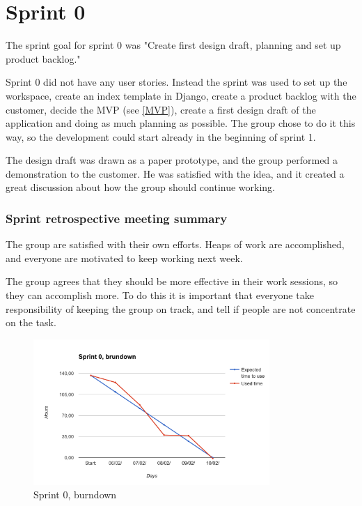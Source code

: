 \section{Sprint 0}
\label{sprint0}
The sprint goal for sprint 0 was "Create first design draft, planning and set up product backlog."

Sprint 0 did not have any user stories. Instead the sprint was used to set up the workspace, create an index template in Django, create a product backlog with the customer, decide the MVP (see \ref{MVP}), create a first design draft of the application and doing as much planning as possible. The group chose to do it this way, so the development could start already in the beginning of sprint 1.

The design draft was drawn as a paper prototype, and the group performed a demonstration to the customer. He was satisfied with the idea, and it created a great discussion about how the group should continue working.

\subsubsection{Sprint retrospective meeting summary}
The group are satisfied with their own efforts. Heaps of work are accomplished, and everyone are motivated to keep working next week.
    
The group agrees that they should be more effective in their work sessions, so they can accomplish more. To do this it is important that everyone take responsibility of keeping the group on track, and tell if people are not concentrate on the task.

\begin{figure}[h!]
\centering
    \includegraphics[width=0.8\textwidth]{fig/sprint0}
\caption{Sprint 0, burndown}
\end{figure}

